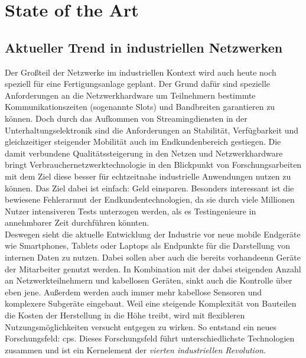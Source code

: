 \chapter{State of the Art}
\section{Aktueller Trend in industriellen Netzwerken}
Der Großteil der Netzwerke im industriellen Kontext wird auch heute noch speziell für eine Fertigungsanlage geplant. Der Grund dafür sind spezielle Anforderungen an die Netzwerkhardware um Teilnehmern bestimmte Kommunikationszeiten (sogenannte Slots) und Bandbreiten garantieren zu können. Doch durch das Aufkommen von Streamingdiensten in der Unterhaltungselektronik sind die Anforderungen an Stabilität, Verfügbarkeit und gleichzeitiger steigender Mobilität auch im Endkundenbereich gestiegen. Die damit verbundene Qualitätssteigerung in den Netzen und Netzwerkhardware bringt Verbrauchernetzwerktechnologie in den Blickpunkt von Forschungsarbeiten mit dem Ziel diese besser für echtzeitnahe industrielle Anwendungen nutzen zu können\cite{wollschlaeger2017future}. Das Ziel dabei ist einfach: Geld einsparen. Besonders interessant ist die bewiesene Fehlerarmut der Endkundentechnologien, da sie durch viele Millionen Nutzer intensiveren Tests unterzogen werden, als es Testingenieure in annehmbarer Zeit durchführen könnten.\\
Deswegen sieht die aktuelle Entwicklung der Industrie vor neue mobile Endgeräte wie Smartphones, Tablets oder Laptops als Endpunkte für die Darstellung von internen Daten zu nutzen. Dabei sollen aber auch die bereits vorhandeenn Geräte der Mitarbeiter genutzt werden\cite{french2014current}. In Kombination mit der dabei steigenden Anzahl an Netzwerkteilnehmern und kabellosen Geräten, sinkt auch die Kontrolle über eben jene. Außerdem werden auch immer mehr kabellose Sensoren und komplexere Subgeräte eingebaut. Weil eine steigende Komplexität von Bauteilen die Kosten der Herstellung in die Höhe treibt, wird mit flexibleren Nutzungsmöglichkeiten versucht entgegen zu wirken. So entstand ein neues Forschungsfeld: \acrlong{cps}. Dieses Forschungsfeld führt unterschiedlichste Technologien zusammen und ist ein Kernelement der \textit{vierten industriellen Revolution}.\\
